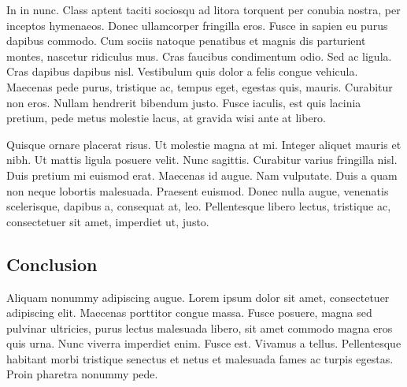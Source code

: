 \documentclass{biorxiv}
\begin{document}
In in nunc. Class aptent taciti sociosqu ad litora torquent per conubia
nostra, per inceptos hymenaeos. Donec ullamcorper fringilla eros. Fusce in
sapien eu purus dapibus commodo. Cum sociis natoque penatibus et magnis dis
parturient montes, nascetur ridiculus mus. Cras faucibus condimentum odio. Sed
ac ligula. Cras dapibus dapibus nisl. Vestibulum quis dolor a felis congue
vehicula. Maecenas pede purus, tristique ac, tempus eget, egestas quis,
mauris. Curabitur non eros. Nullam hendrerit bibendum justo. Fusce iaculis,
est quis lacinia pretium, pede metus molestie lacus, at gravida wisi ante at
libero.

Quisque ornare placerat risus. Ut molestie magna at mi. Integer aliquet mauris
et nibh. Ut mattis ligula posuere velit. Nunc sagittis. Curabitur varius
fringilla nisl. Duis pretium mi euismod erat. Maecenas id augue. Nam
vulputate. Duis a quam non neque lobortis malesuada. Praesent euismod. Donec
nulla augue, venenatis scelerisque, dapibus a, consequat at, leo. Pellentesque
libero lectus, tristique ac, consectetuer sit amet, imperdiet ut, justo.

\subsection{Conclusion}
Aliquam nonummy adipiscing augue. Lorem ipsum dolor sit amet, consectetuer
adipiscing elit. Maecenas porttitor congue massa. Fusce posuere, magna sed
pulvinar ultricies, purus lectus malesuada libero, sit amet commodo magna eros
quis urna. Nunc viverra imperdiet enim. Fusce est. Vivamus a tellus.
Pellentesque habitant morbi tristique senectus et netus et malesuada fames ac
turpis egestas. Proin pharetra nonummy pede.


\nocite{*}  %



\end{document}
